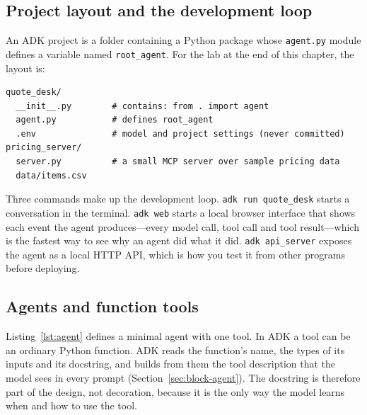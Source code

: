 \subsection{Project layout and the development loop}

An ADK project is a folder containing a Python package whose \texttt{agent.py} module defines a variable named \texttt{root\_agent}. For the lab at the end of this chapter, the layout is:

\begin{lstlisting}[language={},caption={Layout of the Chapter 1 lab project.},label={lst:layout}]
quote_desk/
  __init__.py        # contains: from . import agent
  agent.py           # defines root_agent
  .env               # model and project settings (never committed)
pricing_server/
  server.py          # a small MCP server over sample pricing data
  data/items.csv
\end{lstlisting}

Three commands make up the development loop. \texttt{adk run quote\_desk} starts a conversation in the terminal. \texttt{adk web} starts a local browser interface that shows each event the agent produces---every model call, tool call and tool result---which is the fastest way to see why an agent did what it did. \texttt{adk api\_server} exposes the agent as a local HTTP API, which is how you test it from other programs before deploying.

\subsection{Agents and function tools}

Listing~\ref{lst:agent} defines a minimal agent with one tool. In ADK a tool can be an ordinary Python function. ADK reads the function's name, the types of its inputs and its docstring, and builds from them the tool description that the model sees in every prompt (Section~\ref{sec:block-agent}). The docstring is therefore part of the design, not decoration, because it is the only way the model learns when and how to use the tool.

